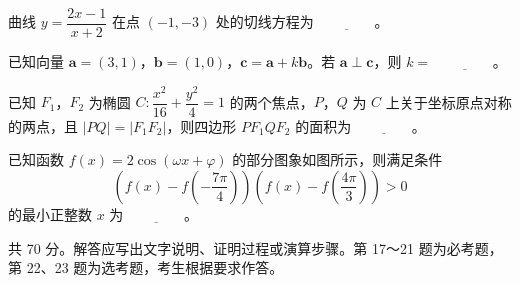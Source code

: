 \begin{question}
曲线 $y=\dfrac{2x-1}{x+2}$ 在点 $(-1,-3)$ 处的切线方程为 $\underline{\qquad\qquad}$。

\end{question}
\begin{question}
已知向量 $\boldsymbol a=(3,1)$，$\boldsymbol b=(1,0)$，$\boldsymbol c=\boldsymbol a+k\boldsymbol b$。若 $\boldsymbol a\perp\boldsymbol c$，则 $k=$ $\underline{\qquad\qquad}$。

\end{question}
\begin{question}
已知 $F_1$，$F_2$ 为椭圆 $C:\dfrac{x^2}{16}+\dfrac{y^2}{4}=1$ 的两个焦点，$P$，$Q$ 为 $C$ 上关于坐标原点对称的两点，且 $|PQ|=|F_1F_2|$，则四边形 $PF_1QF_2$ 的面积为 $\underline{\qquad\qquad}$。

\Needspace{0.4\textheight}
\end{question}
\begin{question}
已知函数 $f(x)=2\cos(\omega x+\varphi)$ 的部分图象如图所示，则满足条件
\nopagebreak[4]
\[
\left(f(x)-f\left(-\dfrac{7\pi}{4}\right)\right)\left(f(x)-f\left(\dfrac{4\pi}{3}\right)\right)>0
\]
的最小正整数 $x$ 为 $\underline{\qquad\qquad}$。
\nopagebreak[4]
\begin{center}\end{center}
\nopagebreak[4]
\par\medskip

\end{question}

\begin{gktip}
共 70 分。解答应写出文字说明、证明过程或演算步骤。第 17～21 题为必考题，第 22、23 题为选考题，考生根据要求作答。
\end{gktip}

